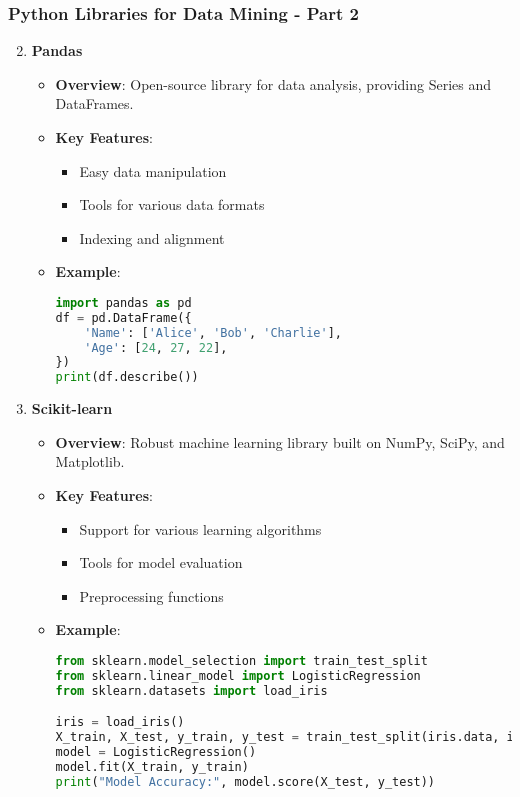 \documentclass[aspectratio=169]{beamer}
\begin{document}
\begin{frame}[fragile]
    \frametitle{Python Libraries for Data Mining - Part 2}
    \begin{enumerate}
        \setcounter{enumi}{1}
        \item \textbf{Pandas}
            \begin{itemize}
                \item \textbf{Overview}: Open-source library for data analysis, providing Series and DataFrames.
                \item \textbf{Key Features}:
                    \begin{itemize}
                        \item Easy data manipulation
                        \item Tools for various data formats
                        \item Indexing and alignment
                    \end{itemize}
                \item \textbf{Example}:
                    \begin{lstlisting}[language=Python]
import pandas as pd
df = pd.DataFrame({
    'Name': ['Alice', 'Bob', 'Charlie'],
    'Age': [24, 27, 22],
})
print(df.describe())
                    \end{lstlisting}
            \end{itemize}
        \item \textbf{Scikit-learn}
            \begin{itemize}
                \item \textbf{Overview}: Robust machine learning library built on NumPy, SciPy, and Matplotlib.
                \item \textbf{Key Features}:
                    \begin{itemize}
                        \item Support for various learning algorithms
                        \item Tools for model evaluation
                        \item Preprocessing functions
                    \end{itemize}
                \item \textbf{Example}:
                    \begin{lstlisting}[language=Python]
from sklearn.model_selection import train_test_split
from sklearn.linear_model import LogisticRegression
from sklearn.datasets import load_iris

iris = load_iris()
X_train, X_test, y_train, y_test = train_test_split(iris.data, iris.target, test_size=0.2)
model = LogisticRegression()
model.fit(X_train, y_train)
print("Model Accuracy:", model.score(X_test, y_test))
                    \end{lstlisting}
            \end{itemize}
    \end{enumerate}
\end{frame}
\end{document}
